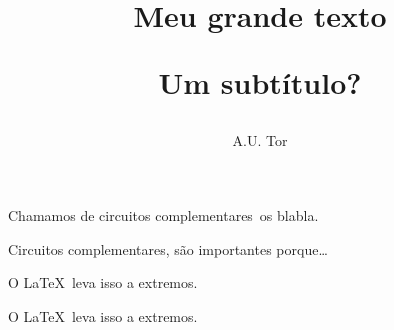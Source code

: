 

%
\newcommand{\latex}{\LaTeX}

\newcommand{\circcomp}{circuitos complementares}

\newcommand{\Circcomp}{Circuitos complementares}



\title{Meu grande texto\par
Um subtítulo?}
\author{A.U. Tor}
\maketitle

Chamamos de \circcomp\ os blabla.

\Circcomp, são importantes porque\ldots

O \LaTeX\ leva isso a extremos.

O \latex\ leva isso a extremos.
